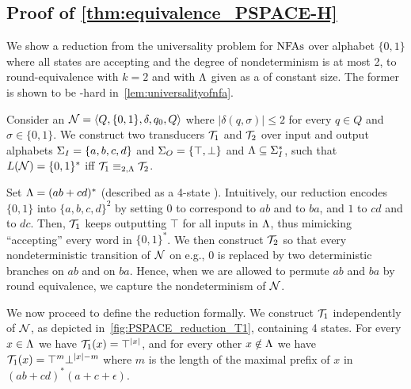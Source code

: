 \subsection{Proof of \autoref{thm:equivalence_PSPACE-H}}
We show a reduction from the universality problem for $\mbox{\rm NFAs}$ over alphabet $\{0,1\}$ where all states are accepting and the degree of nondeterminism is at most 2, to round-equivalence with $k=2$ and with $\Lambda$ given as a \DFA of constant size. The former is shown to be \PSPACE-hard in~\autoref{lem:universalityofnfa}.

Consider an \NFA $\mathcal{N}=\left< Q,\{0,1\},\delta,q_0,Q\right>$ where $|\delta(q,\sigma)|\le 2$ for every $q\in Q$ and $\sigma\in \{0,1\}$.
We construct two transducers $\mathcal{T}_1$ and $\mathcal{T}_2$ over input and output alphabets $\Sigma_{I}=\{a,b,c,d\}$ and $\Sigma_{O}=\{\top,\bot\}$ and $\Lambda\subseteq \Sigma_{I}^*$, such that $L(\mathcal{N})=\{0,1\}^*$ iff $\mathcal{T}_1\equiv_{2,\Lambda}\mathcal{T}_2$. 

Set $\Lambda=(ab+cd)^*$ (described as a 4-state \DFA). Intuitively, our reduction encodes $\{0,1\}$ into $\{a,b,c,d\}^2$ by setting $0$ to correspond to $ab$ and to $ba$, and $1$ to $cd$ and to $dc$. Then, $\mathcal{T}_1$ keeps outputting $\top$ for all inputs in $\Lambda$, thus mimicking ``accepting'' every word in $\{0,1\}^*$. We then construct $\mathcal{T}_2$ so that every nondeterministic transition of $\mathcal{N}$ on e.g., $0$ is replaced by two deterministic branches on $ab$ and on $ba$. Hence, when we are allowed to permute $ab$ and $ba$ by round equivalence, we capture the nondeterminism of $\mathcal{N}$. 

We now proceed to define the reduction formally. We construct $\mathcal{T}_1$ independently of $\mathcal{N}$, as depicted %
in~\autoref{fig:PSPACE_reduction_T1}, containing 4 states. For every $x\in \Lambda$ we have $\mathcal{T}_1(x)=\top^{|x|}$, and for every other $x\notin \Lambda$ we have $\mathcal{T}_1(x)=\top^{m}\bot^{|x|-m}$ where $m$ is the length of the maximal prefix of $x$ in $(ab+cd)^*(a+c+\epsilon)$.

